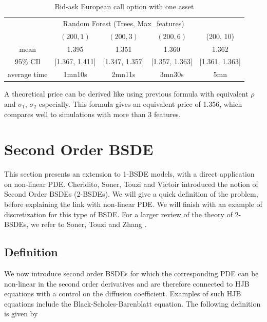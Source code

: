 \documentclass[english,11pt,openany]{report}
\theoremstyle{definition}
\theoremstyle{plain}
\theoremstyle{definition}
\begin{document}
\begin{table}[H]
	\centering
	\caption{Bid-ask European call option with one asset}\label{table:eo20}
	\begin{tabular}{*5c}
		\toprule
		& \multicolumn{3}{c}{Random Forest (Trees, Max\_features)} \\
		\cmidrule(lr){2-4}
		& $(200, 1)$ &  $(200, 3)$ & $(200, 6)$  & (200, 10)\\
		\midrule
		mean &      1.395  &    1.351  & 1.360 & 1.362\\ 
		95\% CIl &  [1.367, 1.411]  &  [1.347, 1.357] & [1.357, 1.363] & [1.361, 1.363] \\
		average time &   1mn10s & 2mn11s & 3mn30s & 5mn \\
		\bottomrule
	\end{tabular}
\end{table}
 

A theoretical price can be derived like using previous formula with equivalent $\rho$ and $\sigma_1$, $\sigma_2$ especially. This formula gives an equivalent price of 1.356, which compares well to simulations with more than 3 features. 

\chapter{Second Order BSDE}

This section presents an extension to 1-BSDE models, with a direct application on non-linear PDE.
Cheridito, Soner, Touzi and Victoir \cite{cheridito:2BSDE} introduced the notion of Second Order BSDEs (2-BSDEs).
\newline
We will give a quick definition of the problem, before explaining the link with non-linear PDE. We will finish with an example of discretization for this type of BSDE. 
For a larger review of the theory of 2-BSDEs, we refer to Soner, Touzi and Zhang \cite{touzi:2BSDE}.

\section{Definition}

We now introduce second
order BSDEs for which the corresponding PDE can be non-linear in the second
order derivatives and are therefore connected to HJB equations with a control on the diffusion coefficient. Examples of such HJB equations include the
Black-Scholes-Barenblatt equation.
The following definition is given by \cite{cheridito:2BSDE}
\end{document}
